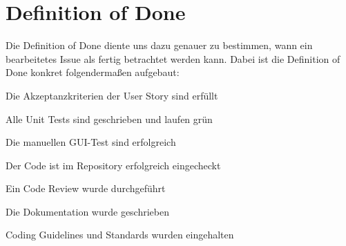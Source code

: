 \chapter{Definition of Done}
Die Definition of Done diente uns dazu genauer zu bestimmen, wann ein bearbeitetes Issue als fertig betrachtet werden kann. Dabei ist die Definition of Done konkret folgendermaßen aufgebaut:
\begin{packed_itemize}
	\item Die Akzeptanzkriterien der User Story sind erfüllt
	\item Alle Unit Tests sind geschrieben und laufen grün
	\item Die manuellen GUI-Test sind erfolgreich
	\item Der Code ist im Repository erfolgreich eingecheckt
	\item Ein Code Review wurde durchgeführt
	\item Die Dokumentation wurde geschrieben
	\item Coding Guidelines und Standards wurden eingehalten
\end{packed_itemize}